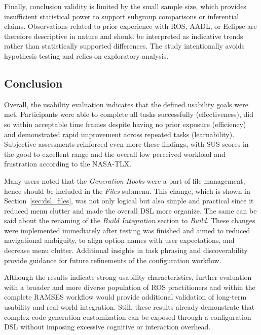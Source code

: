Finally, conclusion validity is limited by the small sample size, which provides insufficient statistical power to support subgroup comparisons or inferential claims. Observations related to prior experience with \gls{ROS}, \gls{AADL}, or Eclipse are therefore descriptive in nature and should be interpreted as indicative trends rather than statistically supported differences. The study intentionally avoids hypothesis testing and relies on exploratory analysis.


\subsection{Conclusion}
\label{sec:test_usabl_conclusion}

Overall, the usability evaluation indicates that the defined usability goals were met. Participants were able to complete all tasks successfully (effectiveness), did so within acceptable time frames despite having no prior exposure (efficiency) and demonstrated rapid improvement across repeated tasks (learnability). Subjective assessments reinforced even more these findings, with \gls{SUS} scores in the good to excellent range and the overall low perceived workload and frustration according to the NASA-\gls{TLX}.

Many users noted that the \textit{Generation Hooks} were a part of file management, hence should be included in the \textit{Files} submenu. This change, which is shown in Section~\ref{sec:dsl_files}, was not only logical but also simple and practical since it reduced menu clutter and made the overall \gls{DSL} more organize. The same can be said about the renaming of the \textit{Build Integration} section to \textit{Build}. These changes were implemented immediately after testing was finished and aimed to reduced navigational ambiguity, to align option names with user expectations, and decrease menu clutter. Additional insights in task phrasing and discoverability provide guidance for future refinements of the configuration workflow.

Although the results indicate strong usability characteristics, further evaluation with a broader and more diverse population of \gls{ROS} practitioners and within the complete \gls{RAMSES} workflow would provide additional validation of long-term usability and real-world integration. Still, these results already demonstrate that complex code generation customization can be exposed through a configuration \gls{DSL} without imposing excessive cognitive or interaction overhead.





















